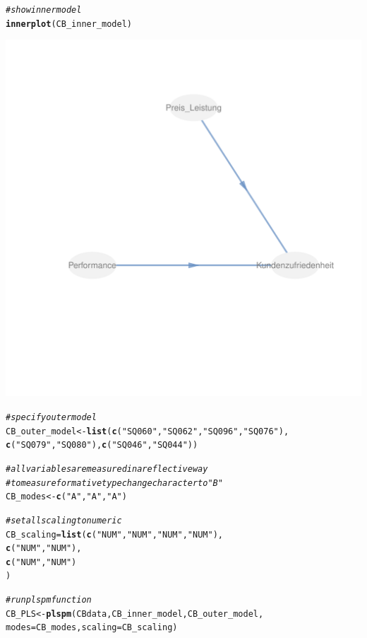 \documentclass{article}\usepackage[]{graphicx}\usepackage[]{color}
\makeatletter
\def\maxwidth{ %
  \ifdim\Gin@nat@width>\linewidth
    \linewidth
  \else
    \Gin@nat@width
  \fi
}
\newcommand{\hlstr}[1]{\textcolor[rgb]{0.192,0.494,0.8}{#1}}%
\newcommand{\hlcom}[1]{\textcolor[rgb]{0.678,0.584,0.686}{\textit{#1}}}%
\newcommand{\hlstd}[1]{\textcolor[rgb]{0.345,0.345,0.345}{#1}}%
\newcommand{\hlkwb}[1]{\textcolor[rgb]{0.69,0.353,0.396}{#1}}%
\newcommand{\hlkwc}[1]{\textcolor[rgb]{0.333,0.667,0.333}{#1}}%
\newcommand{\hlkwd}[1]{\textcolor[rgb]{0.737,0.353,0.396}{\textbf{#1}}}%
\newenvironment{kframe}{%
 \def\at@end@of@kframe{}%
 \ifinner\ifhmode%
  \def\at@end@of@kframe{\end{minipage}}%
  \begin{minipage}{\columnwidth}%
 \fi\fi%
 \def\FrameCommand##1{\hskip\@totalleftmargin \hskip-\fboxsep
 \colorbox{shadecolor}{##1}\hskip-\fboxsep
     \hskip-\linewidth \hskip-\@totalleftmargin \hskip\columnwidth}%
 \MakeFramed {\advance\hsize-\width
   \@totalleftmargin\z@ \linewidth\hsize
   \@setminipage}}%
 {\par\unskip\endMakeFramed%
 \at@end@of@kframe}
\newenvironment{knitrout}{}{} %
\makeatother
\begin{document}
\begin{knitrout}
\begin{kframe}
\begin{alltt}
\hlcom{#show inner model}
\hlkwd{innerplot}\hlstd{(CB_inner_model)}
\end{alltt}
\end{kframe}
\includegraphics[width=\maxwidth]{figure/plspm} 
\begin{kframe}\begin{alltt}
\hlcom{#specify outer model}
\hlstd{CB_outer_model} \hlkwb{<-} \hlkwd{list}\hlstd{(}\hlkwd{c}\hlstd{(}\hlstr{"SQ060"}\hlstd{,}\hlstr{"SQ062"}\hlstd{,}\hlstr{"SQ096"}\hlstd{,}\hlstr{"SQ076"}\hlstd{),}
                       \hlkwd{c}\hlstd{(}\hlstr{"SQ079"}\hlstd{,}\hlstr{"SQ080"}\hlstd{),}\hlkwd{c}\hlstd{(}\hlstr{"SQ046"}\hlstd{,}\hlstr{"SQ044"}\hlstd{))}

\hlcom{#all variables are measured in a reflective way}
\hlcom{#to measure formative type change character to "B"}
\hlstd{CB_modes} \hlkwb{<-} \hlkwd{c}\hlstd{(}\hlstr{"A"}\hlstd{,}\hlstr{"A"}\hlstd{,}\hlstr{"A"}\hlstd{)}

\hlcom{#set all scaling to numeric}
\hlstd{CB_scaling} \hlkwb{=} \hlkwd{list}\hlstd{(}\hlkwd{c}\hlstd{(}\hlstr{"NUM"}\hlstd{,} \hlstr{"NUM"}\hlstd{,}\hlstr{"NUM"}\hlstd{,} \hlstr{"NUM"}\hlstd{),}
                  \hlkwd{c}\hlstd{(}\hlstr{"NUM"}\hlstd{,} \hlstr{"NUM"}\hlstd{),}
                  \hlkwd{c}\hlstd{(}\hlstr{"NUM"}\hlstd{,} \hlstr{"NUM"}\hlstd{)}
\hlstd{)}

\hlcom{#run plspm function}
\hlstd{CB_PLS} \hlkwb{<-} \hlkwd{plspm}\hlstd{(CBdata,CB_inner_model,CB_outer_model,}
                \hlkwc{modes} \hlstd{= CB_modes,} \hlkwc{scaling} \hlstd{= CB_scaling)}
\end{alltt}


{\ttfamily\noindent\bfseries\color{errorcolor}{\#\# Error: Fehlender Wert, wo TRUE/FALSE nötig ist}}\end{kframe}
\end{knitrout}
\end{document}
